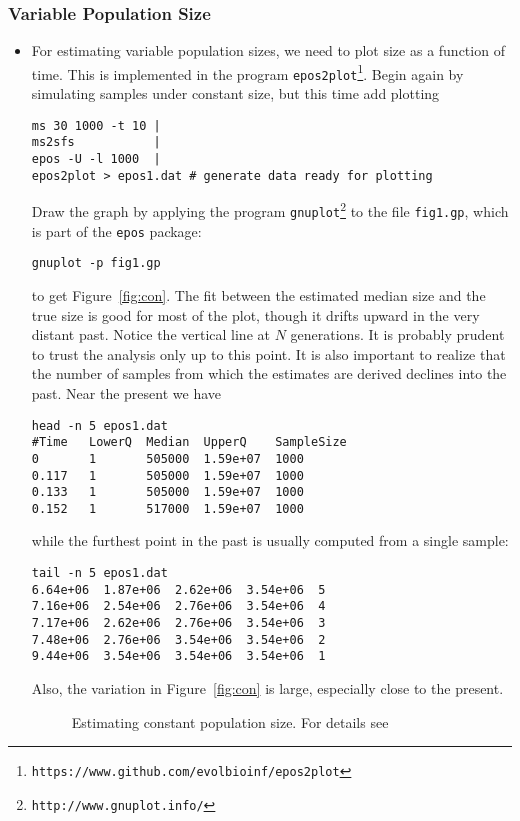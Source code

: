 \documentclass[a4paper, english]{article}
\newcommand{\ty}{\texttt}
\begin{document}
\subsubsection{Variable Population Size}
\begin{itemize}
  \item For estimating variable population sizes, we need to
    plot size as a function of time. This is implemented in the
    program \ty{epos2plot}\footnote{\ty{https://www.github.com/evolbioinf/epos2plot}}. Begin again by simulating samples under constant 
    size, but this time add plotting
\begin{verbatim}
ms 30 1000 -t 10 | 
ms2sfs           | 
epos -U -l 1000  | 
epos2plot > epos1.dat # generate data ready for plotting
\end{verbatim}
Draw the graph by applying the program
\ty{gnuplot}\footnote{\ty{http://www.gnuplot.info/}} to the file
\ty{fig1.gp}, which is part of the \ty{epos} package:
\begin{verbatim}
gnuplot -p fig1.gp
\end{verbatim}
to get Figure~\ref{fig:con}. The fit between the estimated median size
and the true size is good for most of the plot, though it drifts
upward in the very distant past. Notice the vertical line at $N$
generations. It is probably prudent to trust the analysis only up to
this point. It is also important to realize that the number
of samples from which the estimates are derived declines into the
past. Near the present we have
\begin{verbatim}
head -n 5 epos1.dat 
#Time   LowerQ  Median  UpperQ    SampleSize
0       1       505000  1.59e+07  1000
0.117   1       505000  1.59e+07  1000
0.133   1       505000  1.59e+07  1000
0.152   1       517000  1.59e+07  1000
\end{verbatim}        
while the furthest point in the past is usually computed from a single
sample:
\begin{verbatim}
tail -n 5 epos1.dat 
6.64e+06  1.87e+06  2.62e+06  3.54e+06  5
7.16e+06  2.54e+06  2.76e+06  3.54e+06  4
7.17e+06  2.62e+06  2.76e+06  3.54e+06  3
7.48e+06  2.76e+06  3.54e+06  3.54e+06  2
9.44e+06  3.54e+06  3.54e+06  3.54e+06  1
\end{verbatim}
Also, the variation in Figure~\ref{fig:con} is
large, especially close to the present.
\begin{figure}
  \begin{center}
    \scalebox{0.6}{}
  \end{center}
  \caption{Estimating constant population size. For details see
}
\end{figure}
\end{itemize}
\end{document}
